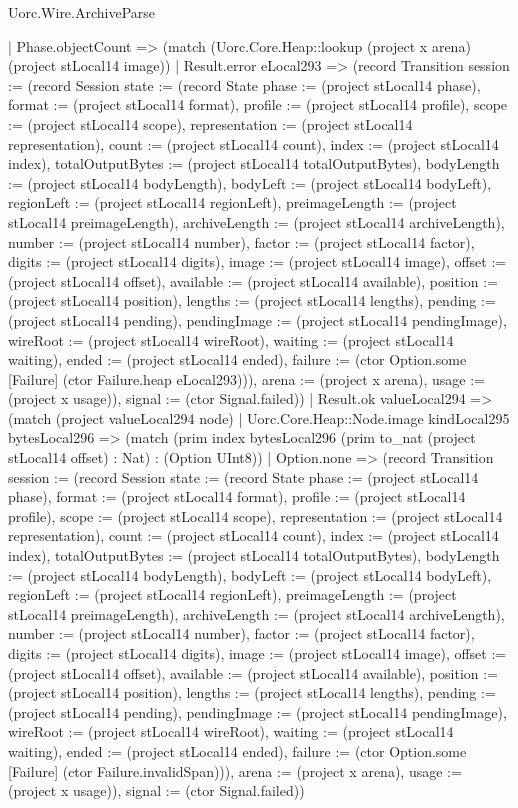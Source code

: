 \begin{lexlean}{Uorc.Wire.ArchiveParse}
\begin{semanticmodule}
{        | Phase.objectCount => (match (Uorc.Core.Heap::lookup (project x arena) (project stLocal14 image))
          | Result.error eLocal293 => (record Transition {session := (record Session {state := (record State {phase := (project stLocal14 phase), format := (project stLocal14 format), profile := (project stLocal14 profile), scope := (project stLocal14 scope), representation := (project stLocal14 representation), count := (project stLocal14 count), index := (project stLocal14 index), totalOutputBytes := (project stLocal14 totalOutputBytes), bodyLength := (project stLocal14 bodyLength), bodyLeft := (project stLocal14 bodyLeft), regionLeft := (project stLocal14 regionLeft), preimageLength := (project stLocal14 preimageLength), archiveLength := (project stLocal14 archiveLength), number := (project stLocal14 number), factor := (project stLocal14 factor), digits := (project stLocal14 digits), image := (project stLocal14 image), offset := (project stLocal14 offset), available := (project stLocal14 available), position := (project stLocal14 position), lengths := (project stLocal14 lengths), pending := (project stLocal14 pending), pendingImage := (project stLocal14 pendingImage), wireRoot := (project stLocal14 wireRoot), waiting := (project stLocal14 waiting), ended := (project stLocal14 ended), failure := (ctor Option.some [Failure] (ctor Failure.heap eLocal293))}), arena := (project x arena), usage := (project x usage)}), signal := (ctor Signal.failed)})
          | Result.ok valueLocal294 => (match (project valueLocal294 node)
            | Uorc.Core.Heap::Node.image kindLocal295 bytesLocal296 => (match (prim index bytesLocal296 (prim to_nat (project stLocal14 offset) : Nat) : (Option UInt8))
              | Option.none => (record Transition {session := (record Session {state := (record State {phase := (project stLocal14 phase), format := (project stLocal14 format), profile := (project stLocal14 profile), scope := (project stLocal14 scope), representation := (project stLocal14 representation), count := (project stLocal14 count), index := (project stLocal14 index), totalOutputBytes := (project stLocal14 totalOutputBytes), bodyLength := (project stLocal14 bodyLength), bodyLeft := (project stLocal14 bodyLeft), regionLeft := (project stLocal14 regionLeft), preimageLength := (project stLocal14 preimageLength), archiveLength := (project stLocal14 archiveLength), number := (project stLocal14 number), factor := (project stLocal14 factor), digits := (project stLocal14 digits), image := (project stLocal14 image), offset := (project stLocal14 offset), available := (project stLocal14 available), position := (project stLocal14 position), lengths := (project stLocal14 lengths), pending := (project stLocal14 pending), pendingImage := (project stLocal14 pendingImage), wireRoot := (project stLocal14 wireRoot), waiting := (project stLocal14 waiting), ended := (project stLocal14 ended), failure := (ctor Option.some [Failure] (ctor Failure.invalidSpan))}), arena := (project x arena), usage := (project x usage)}), signal := (ctor Signal.failed)})
}
\end{semanticmodule}
\end{lexlean}
